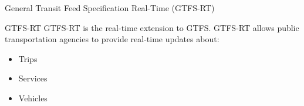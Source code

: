 \documentclass[xcolor=dvipsnames,table]{beamer}
\begin{document}
\begin{frame}{General Transit Feed Specification Real-Time (GTFS-RT)}
        \begin{block}{GTFS-RT}
                GTFS-RT is the real-time extension to GTFS. GTFS-RT allows public transportation agencies to provide real-time updates about:
                \begin{itemize}
                        \item Trips
                        \item Services
                        \item Vehicles
                \end{itemize}
        \end{block}
\end{frame}
\end{document}
